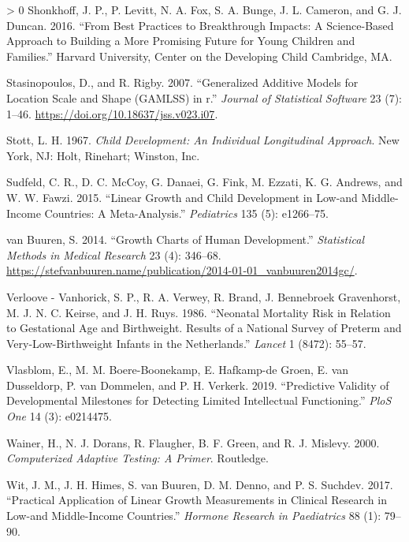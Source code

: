 \documentclass[
]{book}
\newlength{\cslhangindent}
\newenvironment{CSLReferences}[3] %
 {%
  \setlength{\parindent}{0pt}
  \ifodd #1 \everypar{\setlength{\hangindent}{\cslhangindent}}\ignorespaces\fi
  \ifnum #2 > 0
  \setlength{\parskip}{#2\baselineskip}
  \fi
 }%
 {}
\begin{document}
\begin{CSLReferences}{1}{0}
\leavevmode\hypertarget{ref-skonkhoff2016best}{}%
Shonkhoff, J. P., P. Levitt, N. A. Fox, S. A. Bunge, J. L. Cameron, and G. J. Duncan. 2016. {``From Best Practices to Breakthrough Impacts: A Science-Based Approach to Building a More Promising Future for Young Children and Families.''} Harvard University, Center on the Developing Child Cambridge, MA.

\leavevmode\hypertarget{ref-stasinopoulos2007}{}%
Stasinopoulos, D., and R. Rigby. 2007. {``Generalized Additive Models for Location Scale and Shape ({GAMLSS}) in r.''} \emph{Journal of Statistical Software} 23 (7): 1--46. \url{https://doi.org/10.18637/jss.v023.i07}.

\leavevmode\hypertarget{ref-stott1967}{}%
Stott, L. H. 1967. \emph{Child Development: {A}n Individual Longitudinal Approach}. New York, NJ: Holt, Rinehart; Winston, Inc.

\leavevmode\hypertarget{ref-sudfeld2015linear}{}%
Sudfeld, C. R., D. C. McCoy, G. Danaei, G. Fink, M. Ezzati, K. G. Andrews, and W. W. Fawzi. 2015. {``Linear Growth and Child Development in Low-and Middle-Income Countries: A Meta-Analysis.''} \emph{Pediatrics} 135 (5): e1266--75.

\leavevmode\hypertarget{ref-vanbuuren2014}{}%
van Buuren, S. 2014. {``Growth Charts of Human Development.''} \emph{Statistical Methods in Medical Research} 23 (4): 346--68. \url{https://stefvanbuuren.name/publication/2014-01-01_vanbuuren2014gc/}.

\leavevmode\hypertarget{ref-verloove1986}{}%
Verloove - Vanhorick, S. P., R. A. Verwey, R. Brand, J. Bennebroek Gravenhorst, M. J. N. C. Keirse, and J. H. Ruys. 1986. {``Neonatal Mortality Risk in Relation to Gestational Age and Birthweight. Results of a National Survey of Preterm and Very-Low-Birthweight Infants in the Netherlands.''} \emph{Lancet} 1 (8472): 55--57.

\leavevmode\hypertarget{ref-vlasblom2019}{}%
Vlasblom, E., M. M. Boere-Boonekamp, E. Hafkamp-de Groen, E. van Dusseldorp, P. van Dommelen, and P. H. Verkerk. 2019. {``Predictive Validity of Developmental Milestones for Detecting Limited Intellectual Functioning.''} \emph{PloS One} 14 (3): e0214475.

\leavevmode\hypertarget{ref-wainer2000}{}%
Wainer, H., N. J. Dorans, R. Flaugher, B. F. Green, and R. J. Mislevy. 2000. \emph{Computerized Adaptive Testing: A Primer}. Routledge.

\leavevmode\hypertarget{ref-wit2017practical}{}%
Wit, J. M., J. H. Himes, S. van Buuren, D. M. Denno, and P. S. Suchdev. 2017. {``Practical Application of Linear Growth Measurements in Clinical Research in Low-and Middle-Income Countries.''} \emph{Hormone Research in Paediatrics} 88 (1): 79--90.


\end{CSLReferences}
\end{document}
